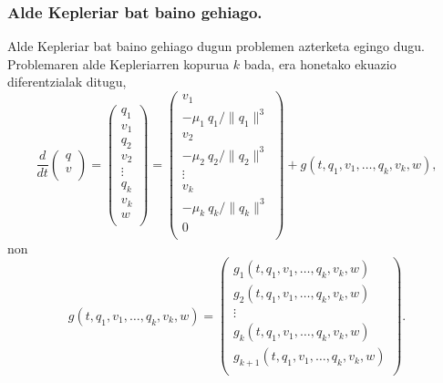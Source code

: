 \subsubsection*{Alde Kepleriar bat baino gehiago.}

Alde Kepleriar bat baino gehiago dugun problemen azterketa egingo dugu. Problemaren alde Kepleriarren kopurua $k$ bada, era honetako ekuazio diferentzialak ditugu,
\begin{equation*}
\frac{d}{dt}\left(\begin{array}{c}
                q  \\
                v  \\
\end{array}\right)=
\left(\begin{array}{c}
                q_1  \\
                v_1  \\
                q_2  \\
                v_2  \\
                \vdots \\
                q_k    \\
                v_k    \\
                w      \\
\end{array}\right)=
\left(\begin{array}{c}
                v_1  \\
                -\mu_1 \ q_1/\|q_1\|^3  \\
                v_2  \\
                -\mu_2 \ q_2/\|q_2\|^3  \\
                \vdots \\
                v_k    \\
                -\mu_k \ q_k/\|q_k\|^3  \\
                0      \\
\end{array}\right)+
g(t,q_1,v_1,\dots, q_k,v_k,w),
\end{equation*} 
non 
\begin{equation*}
g(t,q_1,v_1,\dots, q_k,v_k,w)=
\left(\begin{array}{c}
                g_1(t,q_1,v_1,\dots, q_k,v_k,w)      \\
                g_2 (t,q_1,v_1,\dots, q_k,v_k,w)     \\
                \vdots   \\
                g_k (t,q_1,v_1,\dots, q_k,v_k,w)      \\
                g_{k+1}(t,q_1,v_1,\dots, q_k,v_k,w)    \\
\end{array}\right).
\end{equation*}

